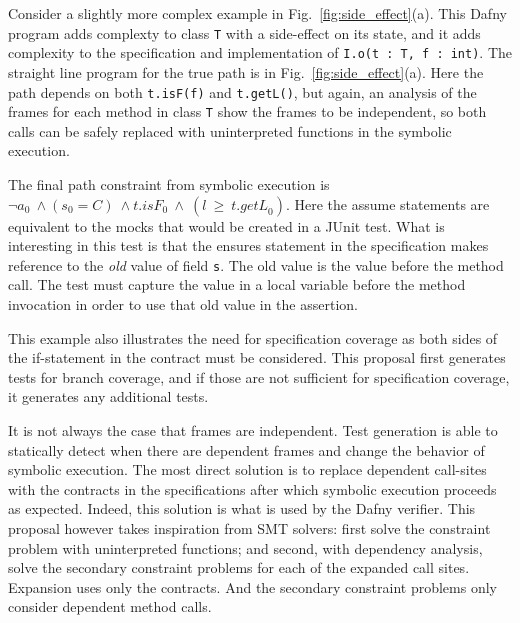 \documentclass[11pt,onecolumn,notitlepage]{article}
\newcommand{\figref}[1]{Fig.~\ref{#1}}
\begin{document}
Consider a slightly more complex example in \figref{fig:side_effect}(a). This Dafny program adds complexty to class \texttt{T} with a side-effect on its state, and it adds complexity to the specification and implementation of \texttt{I.o(t : T, f : int)}. The straight line program for the true path is in \figref{fig:side_effect}(a). Here the path depends on both \texttt{t.isF(f)} and \texttt{t.getL()}, but again, an analysis of the frames for each method in class \texttt{T} show the frames to be independent, so both calls can be safely replaced with uninterpreted functions in the symbolic execution.

The final path constraint from symbolic execution is $\neg a_0\ \wedge (s_0 = C)\ \wedge \mathit{t.isF}_0\ \wedge\ (l\ \ge\ \mathit{t.getL}_0)$. Here the assume statements are equivalent to the mocks that would be created in a JUnit test. What is interesting in this test is that the ensures statement in the specification makes reference to the \emph{old} value of field \texttt{s}. The old value is the value before the method call. The test must capture the value in a local variable before the method invocation in order to use that old value in the assertion. 

This example also illustrates the need for specification coverage as both sides of the if-statement in the contract must be considered. This proposal first generates tests for branch coverage, and if those are not sufficient for specification coverage, it generates any additional tests. 

It is not always the case that frames are independent. Test generation is able to statically detect when there are dependent frames and change the behavior of symbolic execution. The most direct solution is to replace dependent call-sites with the contracts in the specifications after which symbolic execution proceeds as expected. Indeed, this solution is what is used by the Dafny verifier. This proposal however takes inspiration from SMT solvers: first solve the constraint problem with uninterpreted functions; and second, with dependency analysis, solve the secondary constraint problems for each of the expanded call sites. Expansion uses only the contracts. And the secondary constraint problems only consider dependent method calls.
\end{document}
